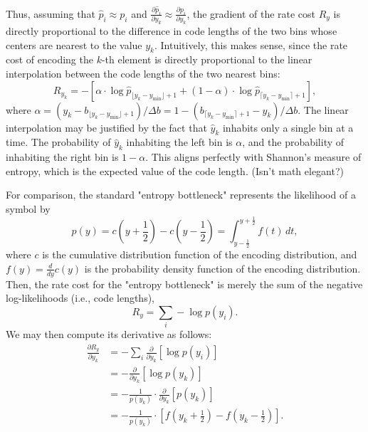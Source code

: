 %
Thus, assuming that $\hat{p}_i \approx p_i$ and $\frac{\partial \hat{p}_i}{\partial y_k} \approx \frac{\partial p_i}{\partial y_k}$, the gradient of the rate cost $R_y$ is directly proportional to the difference in code lengths of the two bins whose centers are nearest to the value $y_k$.
Intuitively, this makes sense, since the rate cost of encoding the $k$-th element is directly proportional to the linear interpolation between the code lengths of the two nearest bins:
%
\begin{equation*}
  R_{y_k} =
  -
  \left[
    \alpha \cdot
    \log \hat{p}_{\lfloor{y_k - y_{\mathrm{min}}}\rfloor + 1} +
    (1 - \alpha) \cdot
    \log \hat{p}_{\lceil{y_k - y_{\mathrm{min}}}\rceil + 1}
  \right],
\end{equation*}
%
where $\alpha
= (y_k - b_{\lfloor{y_k - y_{\mathrm{min}}}\rfloor + 1}) / \Delta b
= 1 - (b_{\lceil{y_k - y_{\mathrm{min}}}\rceil + 1} - y_k) / \Delta b$.
The linear interpolation may be justified by the fact that $\hat{y}_k$ inhabits only a single bin at a time.
The probability of $\hat{y}_k$ inhabiting the left bin is $\alpha$, and the probability of inhabiting the right bin is $1 - \alpha$.
This aligns perfectly with Shannon's measure of entropy, which is the expected value of the code length. %
(Isn't math elegant?)


For comparison, the standard "entropy bottleneck" represents the likelihood of a symbol by
%
\begin{equation*}
  p(y)
  = c{\left(y + \frac{1}{2}\right)} - c{\left(y - \frac{1}{2}\right)}
  = \int_{y - \frac{1}{2}}^{y + \frac{1}{2}} f(t) \, dt,
\end{equation*}
%
where $c$ is the cumulative distribution function of the encoding distribution,
and $f(y) = \frac{d}{dy} c(y)$ is the probability density function of the encoding distribution.
Then, the rate cost for the "entropy bottleneck" is merely the sum of the negative log-likelihoods (i.e., code lengths),
%
\begin{equation*}
  R_y = \sum_i -\log p(y_i).
\end{equation*}
%
We may then compute its derivative as follows:
%
\begin{equation}
  \label{eq:pdf_compression/optimization/dRdy_standard}
  \begin{split}
    \frac{\partial R_y}{\partial y_k}
    &= - \sum_i \frac{\partial}{\partial y_k} \left[ \log p(y_i) \right] \\
    &= - \frac{\partial}{\partial y_k} \left[ \log p(y_k) \right] \\
    &= - \frac{1}{p(y_k)} \cdot \frac{\partial}{\partial y_k} \left[ p(y_k) \right] \\
    &= - \frac{1}{p(y_k)} \cdot \left[
      f{\left(y_k + \frac{1}{2}\right)} - f{\left(y_k - \frac{1}{2}\right)}
    \right].
  \end{split}
\end{equation}

